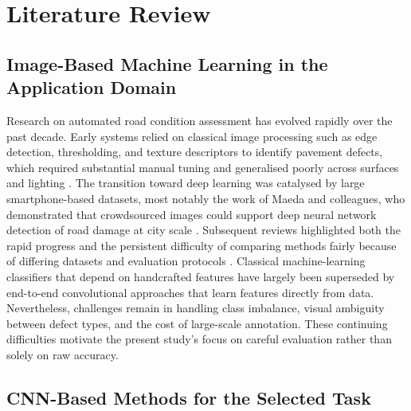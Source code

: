 \documentclass[preprint,12pt]{elsarticle}
\begin{document}
\section{Literature Review}
\label{sec:lit}

\subsection{Image-Based Machine Learning in the Application Domain}

Research on automated road condition assessment has evolved rapidly over the past decade.
Early systems relied on classical image processing such as edge detection, thresholding, and texture descriptors to identify pavement defects, which required substantial manual tuning and generalised poorly across surfaces and lighting \cite{kheradmandi2022critical}.
The transition toward deep learning was catalysed by large smartphone-based datasets, most notably the work of Maeda and colleagues, who demonstrated that crowdsourced images could support deep neural network detection of road damage at city scale \cite{maeda2018road}.
Subsequent reviews highlighted both the rapid progress and the persistent difficulty of comparing methods fairly because of differing datasets and evaluation protocols \cite{arya2024global}.
Classical machine-learning classifiers that depend on handcrafted features have largely been superseded by end-to-end convolutional approaches that learn features directly from data.
Nevertheless, challenges remain in handling class imbalance, visual ambiguity between defect types, and the cost of large-scale annotation.
These continuing difficulties motivate the present study's focus on careful evaluation rather than solely on raw accuracy.

\subsection{CNN-Based Methods for the Selected Task}
\end{document}
